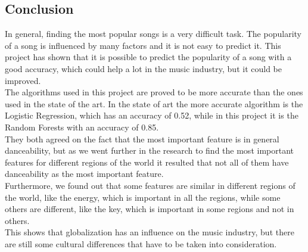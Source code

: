 \subsection{Conclusion}
In general, finding the most popular songs is a very difficult task. The popularity of a song is influenced by many factors and it is not easy to predict it. 
This project has shown that it is possible to predict the popularity of a song with a good accuracy, which could help a lot in the music industry, but it could be improved.\\
The algorithms used in this project are proved to be more accurate than the ones used in the state of the art. In the state of art the more accurate algorithm is the Logistic Regression, which has an accuracy of 0.52, while in this project it is the Random Forests with an accuracy of 0.85.\\
They both agreed on the fact that the most important feature is in general danceability, but as we went further in the research to find the most important features for different regions of the world it resulted that not all of them have danceability as the most important feature.\\
Furthermore, we found out that some features are similar in different regions of the world, like the energy, which is important in all the regions, while some others are different, like the key, which is important in some regions and not in others.\\
This shows that globalization has an influence on the music industry, but there are still some cultural differences that have to be taken into consideration.\\



